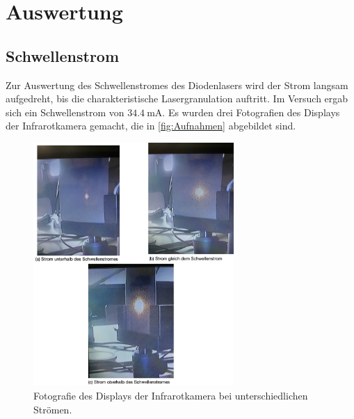 \section{Auswertung}
\label{sec:Auswertung}

\subsection{Schwellenstrom}
\label{subsec:Schwellenstrom}
Zur Auswertung des Schwellenstromes des Diodenlasers wird der Strom langsam aufgedreht, bis die charakteristische Lasergranulation auftritt. Im Versuch
ergab sich ein Schwellenstrom von $\SI{34,4}{\milli\ampere}$. \newline
Es wurden drei Fotografien des Displays der Infrarotkamera gemacht, die in \autoref{fig:Aufnahmen} abgebildet sind.

\begin{figure}[H]
  \centering
  \includegraphics[width=0.68\textwidth]{data/original/Aufnahmen.png}
  \caption{Fotografie des Displays der Infrarotkamera bei unterschiedlichen Strömen.}
  \label{fig:Aufnahmen}
\end{figure}


